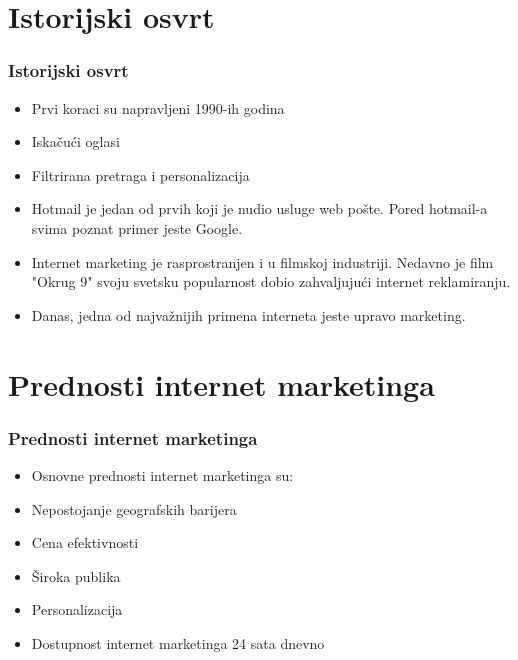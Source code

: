 \documentclass{beamer}
\begin{document}
\section{Istorijski osvrt}
\begin{frame}[fragile]\frametitle{Istorijski osvrt}
	\begin{itemize}
		\item Prvi koraci su napravljeni 1990-ih godina \\
		\item Iskačući oglasi
        \item Filtrirana pretraga i personalizacija
   

\end{itemize}

	\begin{itemize}
		\item Hotmail je jedan od prvih koji je nudio usluge web pošte. Pored hotmail-a svima poznat primer jeste Google. 
		\item Internet marketing je rasprostranjen i u filmskoj industriji. Nedavno je film "Okrug 9" svoju svetsku popularnost dobio zahvaljujući internet reklamiranju.
        \item Danas, jedna od najvažnijih primena interneta jeste upravo marketing.
	\end{itemize}
\end{frame}

\section{Prednosti internet marketinga}
\begin{frame}[fragile]\frametitle{Prednosti internet marketinga}
	\begin{itemize}
	\item Osnovne prednosti internet marketinga su:
    \end{itemize}
    \begin{itemize}
      \item Nepostojanje geografskih barijera
     \item Cena efektivnosti
      \item Široka publika
       \item Personalizacija 
      \item Dostupnost internet marketinga 24 sata dnevno
	\end{itemize}
\end{frame}
\end{document}
